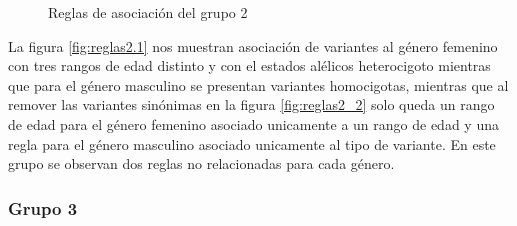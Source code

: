 \begin{figure}[h!]
	\centering
	\caption{Reglas de asociación del grupo 2}\label{fig:reglas2}
\end{figure}

La figura \ref{fig:reglas2.1} nos muestran asociación de variantes al género femenino con tres rangos de edad distinto y con el estados alélicos heterocigoto mientras que para el género masculino se presentan variantes homocigotas, mientras que al remover las variantes sinónimas en la figura \ref{fig:reglas2_2} solo queda un rango de edad para el género femenino asociado unicamente a un rango de edad y una regla para el género masculino asociado unicamente al tipo de variante. En este grupo se observan dos reglas no relacionadas para cada género. 

\subsubsection*{Grupo 3}

